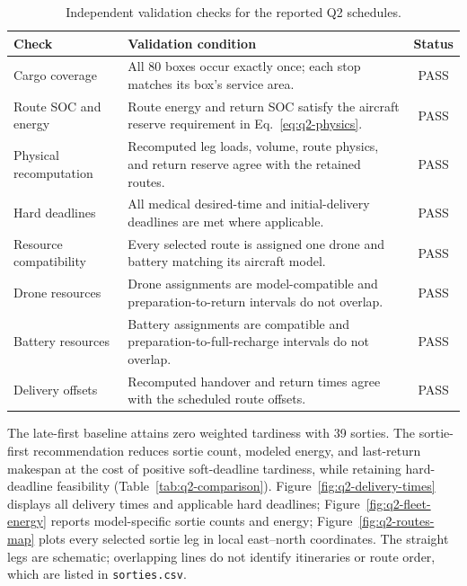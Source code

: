 \begin{table}[H]
\centering
\caption{Independent validation checks for the reported Q2 schedules.}
\label{tab:q2-validation}
\begin{tabularx}{\linewidth}{@{}lXc@{}}
\toprule
Check & Validation condition & Status\\
\midrule
Cargo coverage & All 80 boxes occur exactly once; each stop matches its box's service area. & PASS\\
Route SOC and energy & Route energy and return SOC satisfy the aircraft reserve requirement in Eq.~\eqref{eq:q2-physics}. & PASS\\
Physical recomputation & Recomputed leg loads, volume, route physics, and return reserve agree with the retained routes. & PASS\\
Hard deadlines & All medical desired-time and initial-delivery deadlines are met where applicable. & PASS\\
Resource compatibility & Every selected route is assigned one drone and battery matching its aircraft model. & PASS\\
Drone resources & Drone assignments are model-compatible and preparation-to-return intervals do not overlap. & PASS\\
Battery resources & Battery assignments are compatible and preparation-to-full-recharge intervals do not overlap. & PASS\\
Delivery offsets & Recomputed handover and return times agree with the scheduled route offsets. & PASS\\
\bottomrule
\end{tabularx}
\end{table}

The late-first baseline attains zero weighted tardiness with 39 sorties. The sortie-first recommendation reduces sortie count, modeled energy, and last-return makespan at the cost of positive soft-deadline tardiness, while retaining hard-deadline feasibility (Table~\ref{tab:q2-comparison}). Figure~\ref{fig:q2-delivery-times} displays all delivery times and applicable hard deadlines; Figure~\ref{fig:q2-fleet-energy} reports model-specific sortie counts and energy; Figure~\ref{fig:q2-routes-map} plots every selected sortie leg in local east--north coordinates. The straight legs are schematic; overlapping lines do not identify itineraries or route order, which are listed in \texttt{sorties.csv}.

